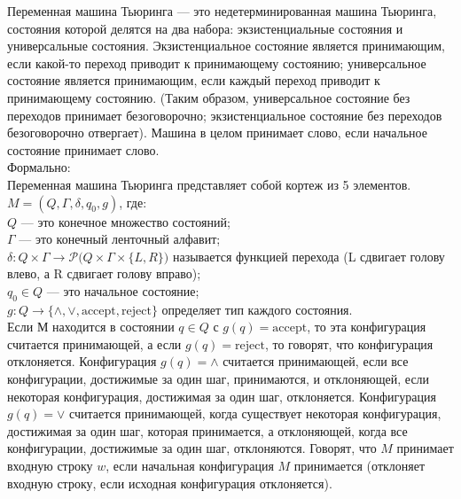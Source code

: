     
    
    \begin{Def}
        Переменная машина Тьюринга — это недетерминированная машина Тьюринга, состояния которой делятся на два набора: экзистенциальные состояния и универсальные состояния. Экзистенциальное состояние является принимающим, если какой-то переход приводит к принимающему состоянию; универсальное состояние является принимающим, если каждый переход приводит к принимающему состоянию. (Таким образом, универсальное состояние без переходов принимает безоговорочно; экзистенциальное состояние без переходов безоговорочно отвергает). Машина в целом принимает слово, если начальное состояние принимает слово.\\
        Формально:\\
        Переменная машина Тьюринга представляет собой кортеж из 5 элементов.\\
        $M = (Q, \Gamma, \delta, q_{0}, g)$, где:\\
        $Q$ --- это конечное множество состояний;\\
        $\Gamma$ --- это конечный ленточный алфавит;\\
        $\delta : Q \times \Gamma \rightarrow {\mathcal {P}(Q\times\Gamma\times\{L,R\}})$ называется функцией перехода (L сдвигает голову влево, а R сдвигает голову вправо);\\
        $q_{0} \in Q$ --- это начальное состояние;\\
        $g : Q \rightarrow \{\wedge, \vee, \text{accept}, \text{reject} \}$ определяет тип каждого состояния.\\
        Если М находится в состоянии $q\in Q$ с $g(q) = \text{accept}$, то эта конфигурация считается принимающей, а если $g(q) = \text{reject}$, то говорят, что конфигурация отклоняется. Конфигурация $g(q) = \wedge$ считается принимающей, если все конфигурации, достижимые за один шаг, принимаются, и отклоняющей, если некоторая конфигурация, достижимая за один шаг, отклоняется. Конфигурация $g(q) = \vee$ считается принимающей, когда существует некоторая конфигурация, достижимая за один шаг, которая принимается, а отклоняющей, когда все конфигурации, достижимые за один шаг, отклоняются. Говорят, что $M$ принимает входную строку $w$, если начальная конфигурация $M$ принимается (отклоняет входную строку, если исходная конфигурация отклоняется).
    \end{Def}
    
